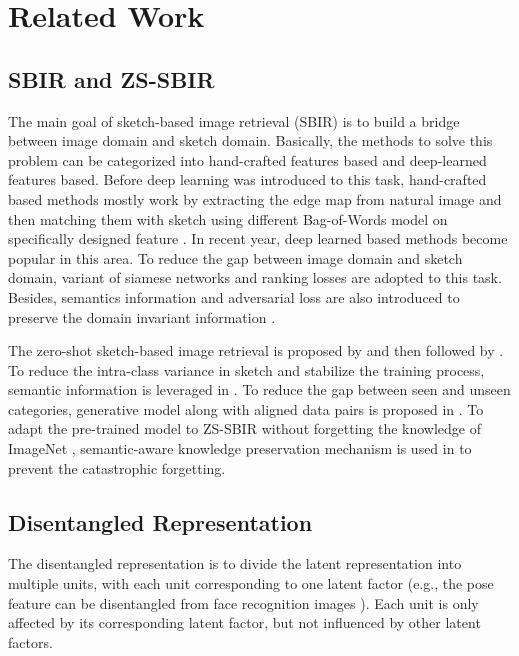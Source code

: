 \documentclass[10pt,twocolumn,letterpaper]{article}
\begin{document}
\section{Related Work}

\subsection{SBIR and ZS-SBIR}
The main goal of sketch-based image retrieval (SBIR) is to build a bridge between image domain and sketch domain. Basically, the methods to solve this problem can be categorized into hand-crafted features based and deep-learned features based. Before deep learning was introduced to this task, hand-crafted based methods mostly work by extracting the edge map from natural image and then matching them with sketch using different Bag-of-Words model on specifically designed feature \cite{saavedra2015sketch, hu2013performance, eitz2010sketch, hu2011bag, eitz2010evaluation}. In recent year, deep learned based methods become popular in this area. To reduce the gap between image domain and sketch domain, variant of siamese networks \cite{qi2016sketch, sangkloy2016sketchy, song2017deep} and ranking losses \cite{chopra2005learning, sangkloy2016sketchy} are adopted to this task. Besides, semantics information and adversarial loss are also introduced to preserve the domain invariant information \cite{chen2018deep}.

The zero-shot sketch-based image retrieval is proposed by \cite{shen2018zero} and then followed by \cite{yelamarthi2018zero, xu2019semantic, wang2019stacked, liu2019semantic, dutta2019semantically}. To reduce the intra-class variance in sketch and stabilize the training process, semantic information is leveraged in \cite{wang2019stacked, shen2018zero, xu2019semantic, dutta2019semantically}. To reduce the gap between seen and unseen categories, generative model along with aligned data pairs is proposed in \cite{yelamarthi2018zero}. To adapt the pre-trained model to ZS-SBIR without forgetting the knowledge of ImageNet \cite{deng2009imagenet}, semantic-aware knowledge preservation mechanism is used in \cite{liu2019semantic} to prevent the catastrophic forgetting.

\subsection{Disentangled Representation}
The disentangled representation is to divide the latent representation into multiple units, with each unit corresponding to one latent factor (e.g., the pose feature can be disentangled from face recognition images \cite{tran2017disentangled}). Each unit is only affected by its corresponding latent factor, but not influenced by other latent factors.
\end{document}
